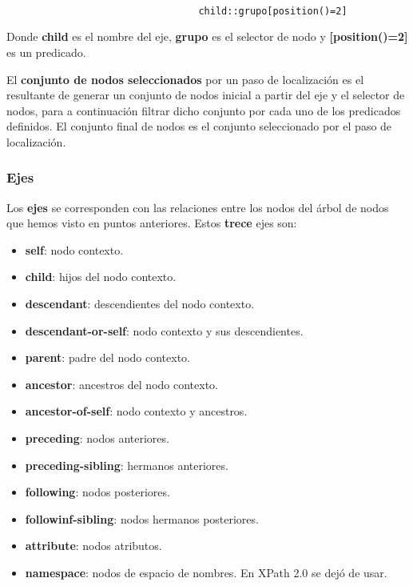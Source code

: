 \begin{figure}[H]
    \begin{tcolorbox}[sharp corners, colback=yellow!30, colframe=white!20]
        \scriptsize
        \begin{verbatim}

                            child::grupo[position()=2]
        \end{verbatim}
    \end{tcolorbox}
\end{figure}

Donde \textbf{child} es el nombre del eje, \textbf{grupo} es el selector de nodo y \textbf{[position()=2]} es un predicado.

El \textbf{conjunto de nodos seleccionados} por un paso de localización es el resultante de generar un conjunto de nodos inicial a partir  del eje y el selector de nodos, para a continuación filtrar dicho conjunto por cada uno de los predicados definidos. El conjunto final de nodos es el conjunto seleccionado por el paso de localización.

\subsubsection{Ejes}
Los \textbf{ejes} se corresponden con las relaciones entre los nodos del árbol de nodos que hemos visto en puntos anteriores. Estos \textbf{trece} ejes son:

\begin{itemize}
    \item \textbf{self}: nodo contexto.
    \item \textbf{child}: hijos del nodo contexto.
    \item \textbf{descendant}: descendientes del nodo contexto.
    \item \textbf{descendant-or-self}: nodo contexto y sus descendientes.
    \item \textbf{parent}: padre del nodo contexto.
    \item \textbf{ancestor}: ancestros del nodo contexto.
    \item \textbf{ancestor-of-self}: nodo contexto y ancestros.
    \item \textbf{preceding}: nodos anteriores.
    \item \textbf{preceding-sibling}: hermanos anteriores.
    \item \textbf{following}: nodos posteriores.
    \item \textbf{followinf-sibling}: nodos hermanos posteriores.
    \item \textbf{attribute}: nodos atributos.
    \item \textbf{namespace}: nodos de espacio de nombres. En XPath 2.0 se dejó de usar.
\end{itemize}

